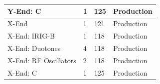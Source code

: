 \documentclass{article}
\begin{document}
\begin{center}
\begin{tabular}{ | l | l | l | l | }
    Y-End: C                           & 1         & 125                     & Production \\ \hline
    X-End                     & 1       & 121                     & Production \\ \hline
    X-End: IRIG-B                             & 1       & 118                     & Production \\ \hline
    X-End: Duotones                             & 4       & 118                     & Production \\ \hline
    X-End: RF Oscillators                 & 2         & 118            &  Production \\ \hline
    X-End: C                           & 1         & 125                     & Production \\ \hline
  \end{tabular}
\end{center}
\clearpage
\end{document}
